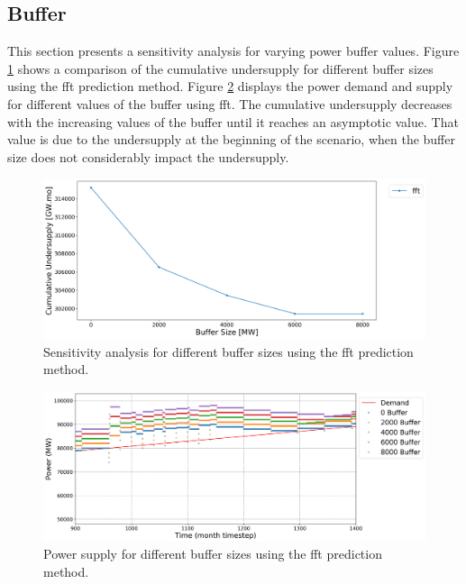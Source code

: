 \documentclass[11pt]{article}
\begin{document}
\subsection{Buffer}

This section presents a sensitivity analysis for varying power buffer values. 
Figure \ref{fig:24-buff} shows a comparison of the cumulative undersupply 
for different buffer sizes using the fft prediction method. 
Figure \ref{fig:24-buf-fft} displays the power demand and supply for different 
values of the buffer using fft. 
The cumulative undersupply decreases with the increasing values of the buffer until it  
reaches an asymptotic value. 
That value is due to the undersupply at the beginning of the scenario, when the buffer size 
does not considerably impact the undersupply.

\begin{figure}[H]
	\centering
	\includegraphics[width=\textwidth]{24-figures/24-sens-buffer.png} 
	\hfill
	\caption{Sensitivity analysis for different buffer sizes using the fft prediction method.}
	\label{fig:24-buff}
\end{figure}

\begin{figure}[H]
	\centering
	\includegraphics[width=\textwidth]{24-figures/24-power-buffer-fft.png} 
	\hfill
	\caption{Power supply for different buffer sizes using the fft prediction method.}
	\label{fig:24-buf-fft}
\end{figure}
\end{document}
